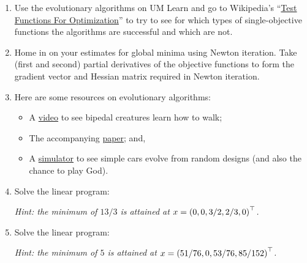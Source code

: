 \documentclass[11pt,letterpaper]{article}
\begin{document}
\begin{enumerate}

\item Use the evolutionary algorithms on UM Learn and go to Wikipedia's ``\href{https://en.wikipedia.org/wiki/Test_functions_for_optimization}{Test Functions For Optimization}'' to try to see for which types of single-objective functions the algorithms are successful and which are not.

\item Home in on your estimates for global minima using Newton iteration. Take (first and second) partial derivatives of the objective functions to form the gradient vector and Hessian matrix required in Newton iteration.

\item Here are some resources on evolutionary algorithms:
\begin{itemize}
\item A \href{https://vimeo.com/79098420}{video} to see bipedal creatures learn how to walk;

\item The accompanying \href{http://www.cs.ubc.ca/~van/papers/2013-TOG-MuscleBasedBipeds/2013-TOG-MuscleBasedBipeds.pdf}{paper}; and,
\item A \href{http://boxcar2d.com}{simulator} to see simple cars evolve from random designs (and also the chance to play God).
\end{itemize}

\item Solve the linear program:

{\em Hint: the minimum of $13/3$ is attained at $x = \pr(0,0,3/2,2/3,0)^\top$.}

\item Solve the linear program:

{\em Hint: the minimum of $5$ is attained at $x = \pr(51/76,0,53/76,85/152)^\top$.}

\end{enumerate}
\end{document}
